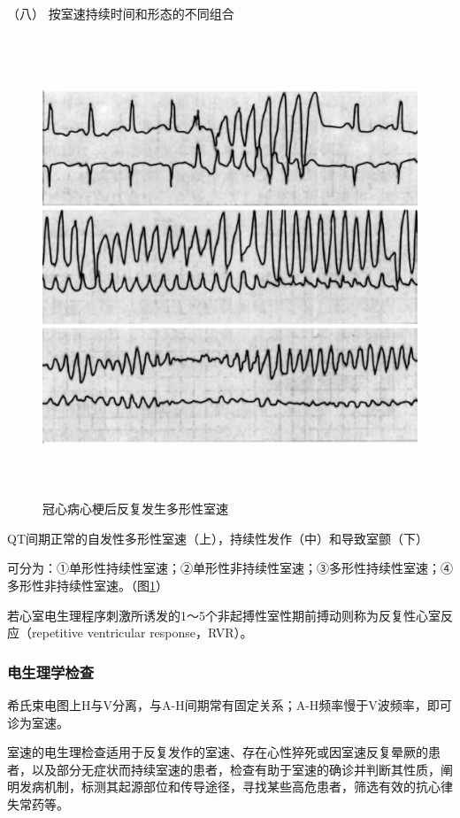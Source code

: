\hypertarget{text00292.htmlux5cux23CHP10-2-5-2-3-8}{}
（八） 按室速持续时间和形态的不同组合

\begin{figure}[!htbp]
 \centering
 \includegraphics[width=5.72917in,height=5.42708in]{./images/Image00441.jpg}
 \captionsetup{justification=centering}
 \caption{冠心病心梗后反复发生多形性室速}
 \label{fig102-10}
  \end{figure} 

QT间期正常的自发性多形性室速（上），持续性发作（中）和导致室颤（下）

可分为：①单形性持续性室速；②单形性非持续性室速；③多形性持续性室速；④多形性非持续性室速。（图\ref{fig102-10}）

若心室电生理程序刺激所诱发的1～5个非起搏性室性期前搏动则称为反复性心室反应（repetitive
ventricular response，RVR）。

\subsubsection{电生理学检查}

希氏束电图上H与V分离，与A-H间期常有固定关系；A-H频率慢于V波频率，即可诊为室速。

室速的电生理检查适用于反复发作的室速、存在心性猝死或因室速反复晕厥的患者，以及部分无症状而持续室速的患者，检查有助于室速的确诊并判断其性质，阐明发病机制，标测其起源部位和传导途径，寻找某些高危患者，筛选有效的抗心律失常药等。

